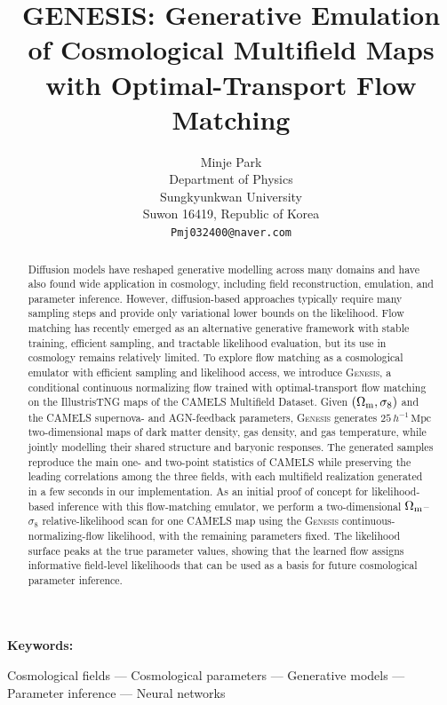 \documentclass{article}
\title{GENESIS: Generative Emulation of Cosmological Multifield Maps with Optimal-Transport Flow Matching}
\author{%
Minje Park\\
Department of Physics\\
Sungkyunkwan University\\
Suwon 16419, Republic of Korea\\
\texttt{Pmj032400@naver.com}
}
\newenvironment{keywords}{%
  \par\vspace{0.75em}\noindent\textbf{Keywords: }\ignorespaces
}{\par\vspace{0.75em}}
\newcommand{\Om}{\Omega_{\rm m}}
\newcommand{\sig}{\sigma_8}
\begin{document}
\maketitle


\begin{abstract}
Diffusion models have reshaped generative modelling across many
domains and have also found wide application in cosmology, including
field reconstruction, emulation, and parameter inference. However,
diffusion-based approaches typically require many sampling steps and
provide only variational lower bounds on the likelihood. Flow matching
has recently emerged as an alternative generative framework with stable
training, efficient sampling, and tractable likelihood evaluation, but
its use in cosmology remains relatively limited.
To explore flow matching as a cosmological emulator with efficient
sampling and likelihood access, we introduce \textsc{Genesis}, a
conditional continuous normalizing flow trained with optimal-transport
flow matching on the IllustrisTNG maps of the CAMELS Multifield
Dataset. Given $(\Om,\sig)$ and the CAMELS supernova- and
AGN-feedback parameters, \textsc{Genesis} generates
$25\,h^{-1}\,\mathrm{Mpc}$ two-dimensional maps of dark matter
density, gas density, and gas temperature, while jointly modelling
their shared structure and baryonic responses. The generated samples
reproduce the main one- and two-point statistics of CAMELS while
preserving the leading correlations among the three fields, with each
multifield realization generated in a few seconds in our
implementation.
As an initial proof of concept for likelihood-based inference with
this flow-matching emulator, we perform a two-dimensional
$\Om$--$\sig$ relative-likelihood scan for one CAMELS map using the
\textsc{Genesis} continuous-normalizing-flow likelihood, with the
remaining parameters fixed. The likelihood surface peaks at the true
parameter values, showing that the learned flow assigns informative
field-level likelihoods that can be used as a basis for future
cosmological parameter inference.
\end{abstract}

\begin{keywords}
Cosmological fields ---
Cosmological parameters ---
Generative models ---
Parameter inference ---
Neural networks
\end{keywords}

\end{document}

